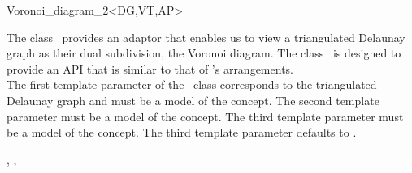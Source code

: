 

\begin{ccRefClass}{Voronoi_diagram_2<DG,VT,AP>}


\ccDefinition

The class \ccRefName\ provides an adaptor that enables us
to view a triangulated Delaunay graph as their dual subdivision, the
Voronoi diagram. The class \ccRefName\ is designed to provide an API
that is similar to that of \cgal's arrangements.\\
The first template parameter of the \ccRefName\ class corresponds to the
triangulated Delaunay graph and must be a model of the
 concept. The second template parameter must be a
model of the  concept. The third template
parameter must be a model of the  concept. The
third template parameter defaults to .


\ccRefines
{}, , 


\end{ccRefClass}
